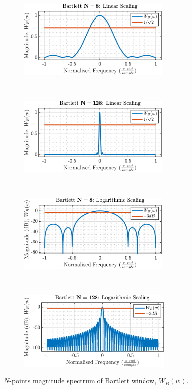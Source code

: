 \begin{enumerate}[label=\alph*), leftmargin=*]
\begin{figure}[h]
    \centering
    \begin{subfigure}{0.49\textwidth}
        \centering
        \includegraphics[height=1.5in]{report/spectrum-estimation/resolution-and-leakage-of-periodogram-based-methods/assets/a/bartlett-linear-N_8}
    \end{subfigure}
    ~ 
    \begin{subfigure}{0.49\textwidth}
        \centering
        \includegraphics[height=1.5in]{report/spectrum-estimation/resolution-and-leakage-of-periodogram-based-methods/assets/a/bartlett-linear-N_128}
    \end{subfigure}
    ~
    ~
    \begin{subfigure}{0.49\textwidth}
        \centering
        \includegraphics[height=1.5in]{report/spectrum-estimation/resolution-and-leakage-of-periodogram-based-methods/assets/a/bartlett-log-N_8}
    \end{subfigure}
    ~ 
    \begin{subfigure}{0.49\textwidth}
        \centering
        \includegraphics[height=1.5in]{report/spectrum-estimation/resolution-and-leakage-of-periodogram-based-methods/assets/a/bartlett-log-N_128}
    \end{subfigure}
    \caption{$N$-points magnitude spectrum of Bartlett window, $W_{B}(w)$.}
    \label{fig:1_3_a_1}
\end{figure}


\end{enumerate}
